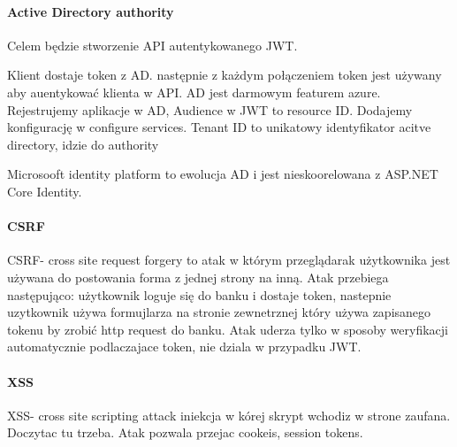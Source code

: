 \documentclass{article}
\begin{document}
\paragraph{Active Directory authority}
Celem będzie stworzenie API autentykowanego JWT.

Klient dostaje token z AD. następnie z każdym połączeniem token jest używany aby auentykować klienta w API.
AD jest darmowym featurem azure. Rejestrujemy aplikacje w AD, Audience w JWT to resource ID. Dodajemy konfigurację w configure
services. Tenant ID to unikatowy identyfikator acitve directory, idzie do authority

Microsooft identity platform to ewolucja AD i jest nieskoorelowana z ASP.NET Core Identity.

\paragraph{CSRF}
CSRF- cross site request forgery to atak w którym przeglądarak użytkownika jest używana do postowania forma z jednej strony na inną.
Atak przebiega następująco: użytkownik loguje się do banku i dostaje token, nastepnie uzytkownik używa formujlarza na stronie zewnetrznej
który używa zapisanego tokenu by zrobić http request do banku. Atak uderza tylko w sposoby weryfikacji automatycznie podlaczajace token, nie dziala w przypadku JWT.

\paragraph{XSS}
XSS- cross site scripting attack iniekcja w kórej skrypt wchodiz w strone zaufana. Doczytac tu trzeba.
Atak pozwala przejac cookeis, session tokens.
\end{document}
